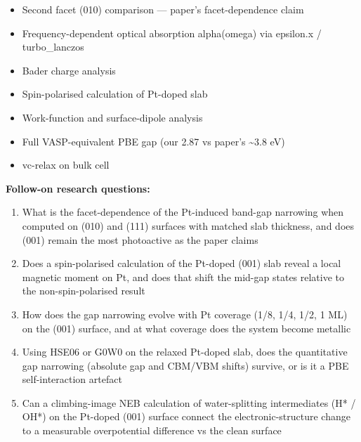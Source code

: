 \documentclass[11pt]{article}
\begin{document}
\begin{itemize}[leftmargin=1.4em,itemsep=0.2em,topsep=0.2em]
\item Second facet (010) comparison --- paper's facet-dependence claim
\item Frequency-dependent optical absorption alpha(omega) via epsilon.x / turbo\_lanczos
\item Bader charge analysis
\item Spin-polarised calculation of Pt-doped slab
\item Work-function and surface-dipole analysis
\item Full VASP-equivalent PBE gap (our 2.87 vs paper's \textasciitilde{}3.8 eV)
\item vc-relax on bulk cell
\end{itemize}\noindent\textbf{Follow-on research questions:}
\begin{enumerate}[leftmargin=1.6em,itemsep=0.2em,topsep=0.2em,label=Q\arabic*.]
\item What is the facet-dependence of the Pt-induced band-gap narrowing when computed on (010) and (111) surfaces with matched slab thickness, and does (001) remain the most photoactive as the paper claims
\item Does a spin-polarised calculation of the Pt-doped (001) slab reveal a local magnetic moment on Pt, and does that shift the mid-gap states relative to the non-spin-polarised result
\item How does the gap narrowing evolve with Pt coverage (1/8, 1/4, 1/2, 1 ML) on the (001) surface, and at what coverage does the system become metallic
\item Using HSE06 or G0W0 on the relaxed Pt-doped slab, does the quantitative gap narrowing (absolute gap and CBM/VBM shifts) survive, or is it a PBE self-interaction artefact
\item Can a climbing-image NEB calculation of water-splitting intermediates (H* / OH*) on the Pt-doped (001) surface connect the electronic-structure change to a measurable overpotential difference vs the clean surface
\end{enumerate}
\end{document}
